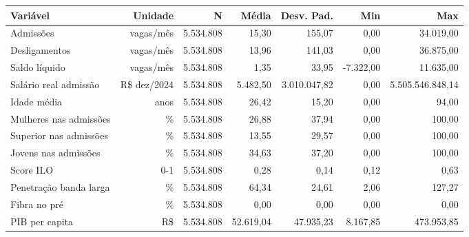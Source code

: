 \scriptsize
\begin{tabular}{lrrrrrr}
\toprule
Variável & Unidade & N & Média & Desv. Pad. & Min & Max \\
\midrule
Admissões & vagas/mês & 5.534.808 & 15,30 & 155,07 & 0,00 & 34.019,00 \\
Desligamentos & vagas/mês & 5.534.808 & 13,96 & 141,03 & 0,00 & 36.875,00 \\
Saldo líquido & vagas/mês & 5.534.808 & 1,35 & 33,95 & -7.322,00 & 11.635,00 \\
Salário real admissão & R\$ dez/2024 & 5.534.808 & 5.482,50 & 3.010.047,82 & 0,00 & 5.505.546.848,14 \\
Idade média & anos & 5.534.808 & 26,42 & 15,20 & 0,00 & 94,00 \\
Mulheres nas admissões & \% & 5.534.808 & 26,88 & 37,94 & 0,00 & 100,00 \\
Superior nas admissões & \% & 5.534.808 & 13,55 & 29,57 & 0,00 & 100,00 \\
Jovens nas admissões & \% & 5.534.808 & 34,63 & 37,20 & 0,00 & 100,00 \\
Score ILO & 0-1 & 5.534.808 & 0,28 & 0,14 & 0,12 & 0,63 \\
Penetração banda larga & \% & 5.534.808 & 64,34 & 24,61 & 2,06 & 127,27 \\
Fibra no pré & \% & 5.534.808 & 0,00 & 0,00 & 0,00 & 0,00 \\
PIB per capita & R\$ & 5.534.808 & 52.619,04 & 47.935,23 & 8.167,85 & 473.953,85 \\
\bottomrule
\end{tabular}
